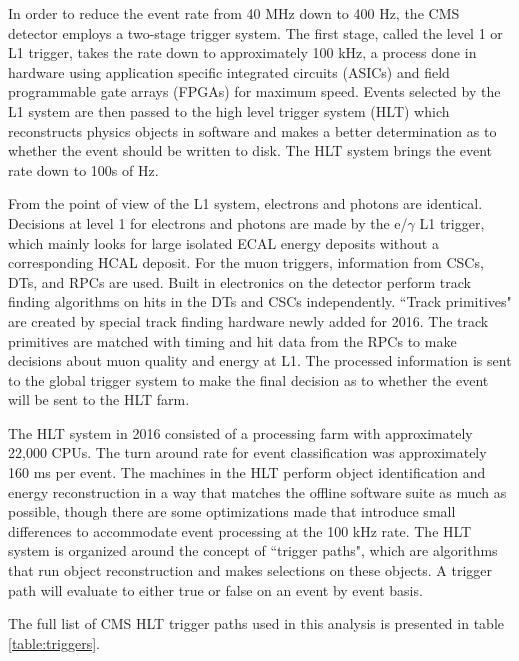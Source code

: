     In order to reduce the event rate from 40 MHz down to 400 Hz, the CMS detector employs a two-stage trigger system. The first stage, called the level 1 or L1 trigger, takes the rate down to approximately 100 kHz, a process done in hardware using application specific integrated circuits (ASICs) and field programmable gate arrays (FPGAs) for maximum speed. Events selected by the L1 system are then passed to the high level trigger system (HLT) which reconstructs physics objects in software and makes a better determination as to whether the event should be written to disk. The HLT system brings the event rate down to 100s of Hz.

    From the point of view of the L1 system, electrons and photons are identical. Decisions at level 1 for electrons and photons are made by the e/$\gamma$ L1 trigger, which mainly looks for large isolated ECAL energy deposits without a corresponding HCAL deposit. For the muon triggers, information from CSCs, DTs, and RPCs are used. Built in electronics on the detector perform track finding algorithms on hits in the DTs and CSCs independently. ``Track primitives" are created by special track finding hardware newly added for 2016. The track primitives are matched with timing and hit data from the RPCs to make decisions about muon quality and energy at L1. The processed information is sent to the global trigger system to make the final decision as to whether the event will be sent to the HLT farm.

    The HLT system in 2016 consisted of a processing farm with approximately 22,000 CPUs. The turn around rate for event classification was approximately 160 ms per event. The machines in the HLT perform object identification and energy reconstruction in a way that matches the offline software suite as much as possible, though there are some optimizations made that introduce small differences to accommodate event processing at the 100 kHz rate. The HLT system is organized around the concept of ``trigger paths", which are algorithms that run object reconstruction and makes selections on these objects. A trigger path will evaluate to either true or false on an event by event basis. 

    The full list of CMS HLT trigger paths used in this analysis is presented in table \ref{table:triggers}. 

